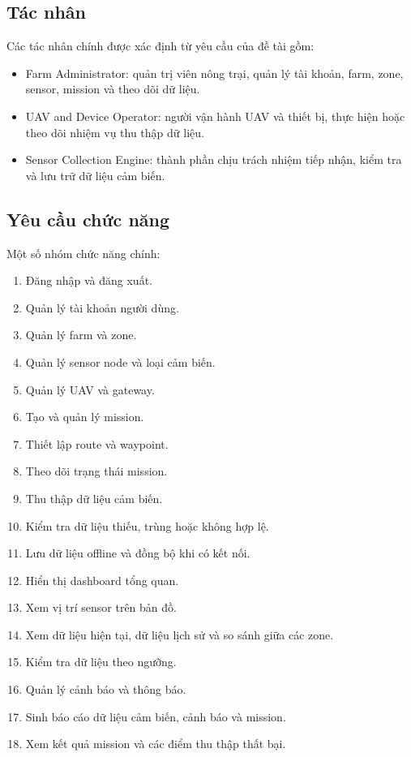 
\subsection{Tác nhân}
Các tác nhân chính được xác định từ yêu cầu của đề tài gồm:
\begin{itemize}
    \item Farm Administrator: quản trị viên nông trại, quản lý tài khoản, farm, zone, sensor, mission và theo dõi dữ liệu.
    \item UAV and Device Operator: người vận hành UAV và thiết bị, thực hiện hoặc theo dõi nhiệm vụ thu thập dữ liệu.
    \item Sensor Collection Engine: thành phần chịu trách nhiệm tiếp nhận, kiểm tra và lưu trữ dữ liệu cảm biến.
\end{itemize}

\subsection{Yêu cầu chức năng}
Một số nhóm chức năng chính:
\begin{enumerate}
    \item Đăng nhập và đăng xuất.
    \item Quản lý tài khoản người dùng.
    \item Quản lý farm và zone.
    \item Quản lý sensor node và loại cảm biến.
    \item Quản lý UAV và gateway.
    \item Tạo và quản lý mission.
    \item Thiết lập route và waypoint.
    \item Theo dõi trạng thái mission.
    \item Thu thập dữ liệu cảm biến.
    \item Kiểm tra dữ liệu thiếu, trùng hoặc không hợp lệ.
    \item Lưu dữ liệu offline và đồng bộ khi có kết nối.
    \item Hiển thị dashboard tổng quan.
    \item Xem vị trí sensor trên bản đồ.
    \item Xem dữ liệu hiện tại, dữ liệu lịch sử và so sánh giữa các zone.
    \item Kiểm tra dữ liệu theo ngưỡng.
    \item Quản lý cảnh báo và thông báo.
    \item Sinh báo cáo dữ liệu cảm biến, cảnh báo và mission.
    \item Xem kết quả mission và các điểm thu thập thất bại.
\end{enumerate}

